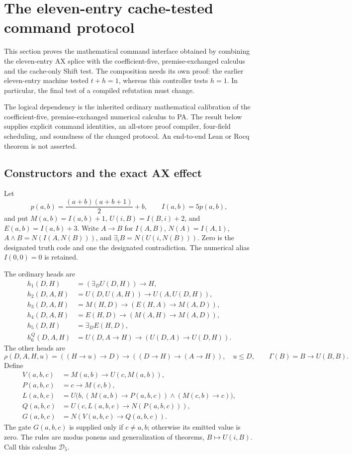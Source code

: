 \section{The eleven-entry cache-tested command protocol}
\label{sec:ax11qh5-proof}

This section proves the mathematical command interface obtained by combining
the eleven-entry AX splice with the coefficient-five, premise-exchanged
calculus and the cache-only Shift test. The composition needs its own proof:
the earlier eleven-entry machine tested $t+h=1$, whereas this controller tests
$h=1$. In particular, the final test of a compiled refutation must change.

The logical dependency is the inherited ordinary mathematical calibration of
the coefficient-five, premise-exchanged numerical calculus to PA. The result
below supplies explicit command identities, an all-store proof compiler,
four-field scheduling, and soundness of the changed protocol. An end-to-end
Lean or Rocq theorem is not asserted.

\subsection{Constructors and the exact AX effect}

Let
\[
 p(a,b)=\frac{(a+b)(a+b+1)}2+b,
 \qquad I(a,b)=5p(a,b),
\]
and put $M(a,b)=I(a,b)+1$, $U(i,B)=I(B,i)+2$, and
$E(a,b)=I(a,b)+3$. Write $A\to B$ for $I(A,B)$,
$N(A)=I(A,1)$, $A\wedge B=N(I(A,N(B)))$, and
$\exists_i B=N(U(i,N(B)))$. Zero is the designated truth code and one the
designated contradiction. The numerical alias $I(0,0)=0$ is retained.

The ordinary heads are
\begin{align*}
 h_1(D,H)&=(\exists_D U(D,H))\to H,\\
 h_2(D,A,H)&=U(D,U(A,H))\to U(A,U(D,H)),\\
 h_3(D,A,H)&=M(H,D)\to(E(H,A)\to M(A,D)),\\
 h_4(D,A,H)&=E(H,D)\to(M(A,H)\to M(A,D)),\\
 h_5(D,H)&=\exists_D E(H,D),\\
 h_6^{Q}(D,A,H)&=U(D,A\to H)\to(U(D,A)\to U(D,H)).
\end{align*}
The other heads are
\[
 \rho(D,A,H,u)=((H\to u)\to D)\to((D\to H)\to(A\to H)),
 \quad u\le D,
 \qquad \Gamma(B)=B\to U(B,B).
\]
Define
\begin{align*}
 V(a,b,c)&=M(a,b)\to U(c,M(a,b)),\\
 P(a,b,c)&=c\to M(c,b),\\
 L(a,b,c)&=U\bigl(b,(M(a,b)\to P(a,b,c))
                         \wedge(M(c,b)\to c)\bigr),\\
 Q(a,b,c)&=U(c,L(a,b,c)\to N(P(a,b,c))),\\
 G(a,b,c)&=N(V(a,b,c)\to Q(a,b,c)).
\end{align*}
The gate $G(a,b,c)$ is supplied only if $c\ne a,b$; otherwise its emitted
value is zero. The rules are modus ponens and generalization of theorems,
$B\mapsto U(i,B)$. Call this calculus $\mathcal D_5$.

